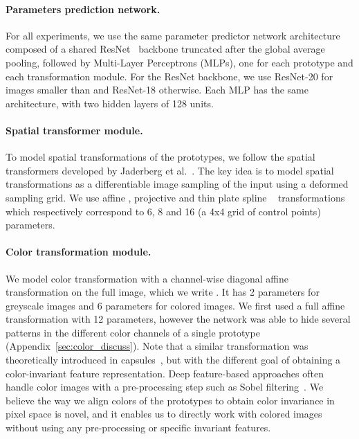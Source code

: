 \documentclass{article}
\begin{document}
\vspace{-0.7em}
\paragraph{Parameters prediction network.} For all experiments, we use the same parameter 
predictor network architecture composed of a shared ResNet~\cite{heDeepResidualLearning2016}
backbone truncated after the global average pooling, followed by  Multi-Layer 
Perceptrons (MLPs), one for each prototype and each transformation module. For the ResNet 
backbone, we use ResNet-20 for images smaller than  and ResNet-18 otherwise. 
Each MLP has the same architecture, with two hidden layers of 128 units.

\vspace{-0.7em}
\paragraph{Spatial transformer module.}  To model spatial transformations of the prototypes, 
we follow the spatial transformers developed by Jaderberg et  
al.~\cite{jaderbergSpatialTransformerNetworks2015}. The key idea is to model spatial 
transformations as a differentiable image sampling of the input using a deformed sampling 
grid. We use affine , projective  
and thin plate spline 
~\cite{booksteinPrincipalWarpsThinplate1989} transformations 
which respectively correspond to 6, 8 and 16 (a 4x4 grid of control points) parameters.

\vspace{-0.7em}
\paragraph{Color transformation module.} We model color transformation with a channel-wise 
diagonal affine transformation on the full image, which we write 
. It has 2 parameters for greyscale images and 6 parameters for 
colored images. We first used a full affine transformation with 12 parameters, however the 
network was able to hide several patterns in the different color channels of a single 
prototype (Appendix~\ref{sec:color_discuss}). Note that a similar transformation was 
theoretically introduced in capsules~\cite{kosiorekStackedCapsuleAutoencoders2019}, but with 
the different goal of obtaining a color-invariant feature representation. Deep feature-based 
approaches often handle color images with a pre-processing step such as Sobel 
filtering~\cite{caronDeepClusteringUnsupervised2018, jiInvariantInformationClustering2019, 
kosiorekStackedCapsuleAutoencoders2019}.
We believe the way we align colors of the prototypes to obtain color invariance in pixel 
space is novel, and it enables us to directly work with colored images without using any 
pre-processing or specific invariant features.
\end{document}
